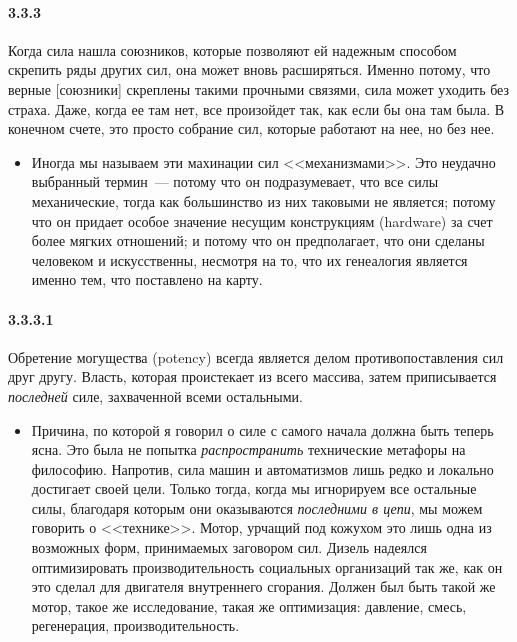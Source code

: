 \paragraph{3.3.3}\hypertarget{par:3.3.3}{} Когда сила нашла союзников, которые позволяют ей надежным способом скрепить ряды других сил, она может вновь расширяться. Именно потому, что верные [союзники] скреплены такими прочными связями, сила может уходить без страха. Даже, когда ее там нет, все произойдет так, как если бы она там была. В конечном счете, это просто собрание сил, которые работают на нее, но без нее.
	\begin{itemize}
	\item 
	Иногда мы называем эти махинации сил <<механизмами>>. Это неудачно выбранный термин~--- потому что он подразумевает, что все силы механические, тогда как большинство из них таковыми не является; потому что он придает особое значение несущим конструкциям (hardware) за счет более мягких отношений; и потому что он предполагает, что они сделаны человеком и искусственны, несмотря на то, что их генеалогия является именно тем, что поставлено на карту.
	\end{itemize}

\paragraph{3.3.3.1}\hypertarget{par:3.3.3.1}{} Обретение могущества (potency) всегда является делом противопоставления сил друг другу. Власть, которая проистекает из всего массива, затем приписывается {\itshape последней} силе, захваченной всеми остальными. 
	\begin{itemize}
	\item 
	Причина, по которой я говорил о силе с самого начала должна быть теперь ясна. Это была не попытка {\itshape распространить} технические метафоры на философию. Напротив, сила машин и автоматизмов лишь редко и локально достигает своей цели. Только тогда, когда мы игнорируем все остальные силы, благодаря которым они оказываются {\itshape последними в цепи}, мы можем говорить о <<технике>>. Мотор, урчащий под кожухом это лишь одна из возможных форм, принимаемых заговором сил. Дизель надеялся оптимизировать производительность социальных организаций так же, как он это сделал для двигателя внутреннего сгорания. Должен был быть такой же мотор, такое же исследование, такая же оптимизация: давление, смесь, регенерация, производительность.
	\end{itemize}

